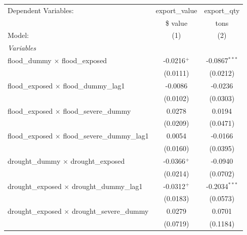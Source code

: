 
\begingroup
\centering
\begin{tabular}{lcc}
   \tabularnewline \midrule \midrule
   Dependent Variables:                                              & export\_value         & export\_qty\\   
                                                                     & \$ value              & tons \\   
   Model:                                                            & (1)                   & (2)\\  
   \midrule
   \emph{Variables}\\
   flood\_dummy $\times$ flood\_exposed                              & -0.0216$^{+}$         & -0.0867$^{***}$\\   
                                                                     & (0.0111)              & (0.0212)\\   
   flood\_exposed $\times$ flood\_dummy\_lag1                        & -0.0086               & -0.0236\\   
                                                                     & (0.0102)              & (0.0303)\\   
   flood\_exposed $\times$ flood\_severe\_dummy                      & 0.0278                & 0.0194\\   
                                                                     & (0.0209)              & (0.0471)\\   
   flood\_exposed $\times$ flood\_severe\_dummy\_lag1                & 0.0054                & -0.0166\\   
                                                                     & (0.0160)              & (0.0395)\\   
   drought\_dummy $\times$ drought\_exposed                          & -0.0366$^{+}$         & -0.0940\\   
                                                                     & (0.0214)              & (0.0702)\\   
   drought\_exposed $\times$ drought\_dummy\_lag1                    & -0.0312$^{+}$         & -0.2034$^{***}$\\   
                                                                     & (0.0183)              & (0.0573)\\   
   drought\_exposed $\times$ drought\_severe\_dummy                  & 0.0279                & 0.0701\\   
                                                                     & (0.0719)              & (0.1184)\\   

\end{tabular}
